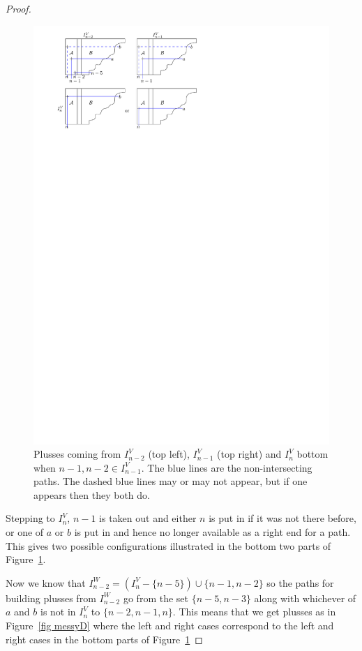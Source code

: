 \documentclass[11pt]{article}
\theoremstyle{remark}
\theoremstyle{definition}
\begin{document}
\begin{proof}
  \begin{figure}
    \includegraphics{messy}
    \caption{Plusses coming from $I_{n-2}^{V}$ (top left),  $I_{n-1}^{V}$ (top right) and $I_{n}^{V}$ bottom when $n-1, n-2\in I_{n-1}^{V}$.  The blue lines are the non-intersecting paths.  The dashed blue lines may or may not appear, but if one appears then they both do.}\label{fig messy}
  \end{figure}

  Stepping to $I_{n}^{V}$, $n-1$ is taken out and either $n$ is put in if it was not there before, or one of $a$ or $b$ is put in and hence no longer available as a right end for a path.  This gives two possible configurations illustrated in the bottom two parts of Figure~\ref{fig messy}.

  Now we know that $I_{n-2}^{W}  = (I_{n}^{V} - \{n-5\})\cup \{n-1,n-2\}$ so the paths for building plusses from $I_{n-2}^{W}$ go from the set $\{n-5, n-3\}$ along with whichever of $a$ and $b$ is not in $I_{n}^{V}$ to $\{n-2, n-1, n\}$.  This means that we get plusses as in Figure~\ref{fig messyD} where the left and right cases correspond to the left and right cases in the bottom parts of Figure~\ref{fig messy}


\end{proof}
\end{document}
